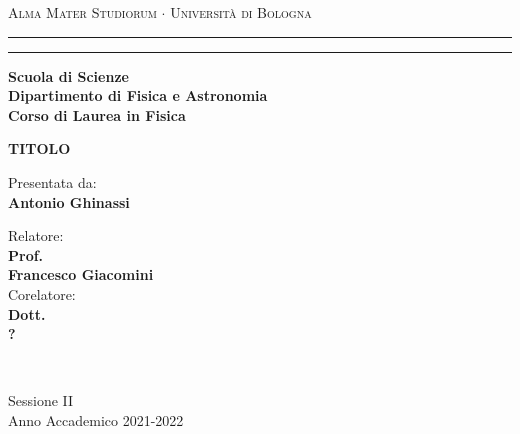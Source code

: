 \documentclass[../main.tex]{subfiles}
\begin{document}
\begin{titlepage}
    \begin{center}
        {{\Large{\textsc{Alma Mater Studiorum $\cdot$ Università di
                            Bologna}}}} \rule[0.1cm]{15.8cm}{0.1mm}
        \rule[0.5cm]{15.8cm}{0.6mm}
        {\small{\bf         Scuola di Scienze \\
                Dipartimento di Fisica e Astronomia\\
                Corso di Laurea in Fisica }}
    \end{center}
    \vspace{15mm}
    \begin{center}
        \vspace{3cm}
        \Large
        {\textbf{TITOLO}}
        \vspace{1cm}
    \end{center}
    \vspace{40mm}
    \par
    \noindent

    \vspace{1 cm}
    \begin{minipage}[t]{0.34\textwidth}
        \begin{flushleft}
            {Presentata da: \\ \textbf{Antonio Ghinassi}}
        \end{flushleft}
    \end{minipage}
    \begin{minipage}[t]{0.64\textwidth}
        \begin{flushright}
            Relatore: \\
            \textbf{Prof.} \\
            \textbf{Francesco Giacomini} \\
            \vspace{0.5 cm}
            Corelatore: \\
            \textbf{Dott.}
            \\ \textbf{?}
        \end{flushright}
    \end{minipage}\\

    \vspace{20mm}
    \begin{center}
        {\large{ Sessione II\\
                Anno Accademico 2021-2022}}
    \end{center}
\end{titlepage}
\end{document}
